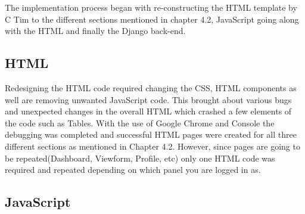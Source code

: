 \documentclass[../main.tex]{subfiles}
\begin{document}
\raggedright
The implementation process began with re-constructing the HTML template by C Tim\cite{creativeTimTemplate} to the different sections mentioned in chapter 4.2, JavaScript going along with the HTML and finally the Django back-end.

\subsection{HTML}
Redesigning the HTML code required changing the CSS, HTML components as well are removing unwanted JavaScript code. This brought about various bugs and unexpected changes in the overall HTML which crashed a few elements of the code such as Tables. With the use of Google Chrome and Console the debugging was completed and successful HTML pages were created for all three different sections as mentioned in Chapter 4.2. However, since pages are going to be repeated(Dashboard, Viewform, Profile, etc) only one HTML code was required and repeated depending on which panel you are logged in as.

\bgroup
\def\arraystretch{2}%
\begin{table}[H]
\centering
\centering
{}
\end{table}
\egroup


\subsection{JavaScript}
\end{document}
